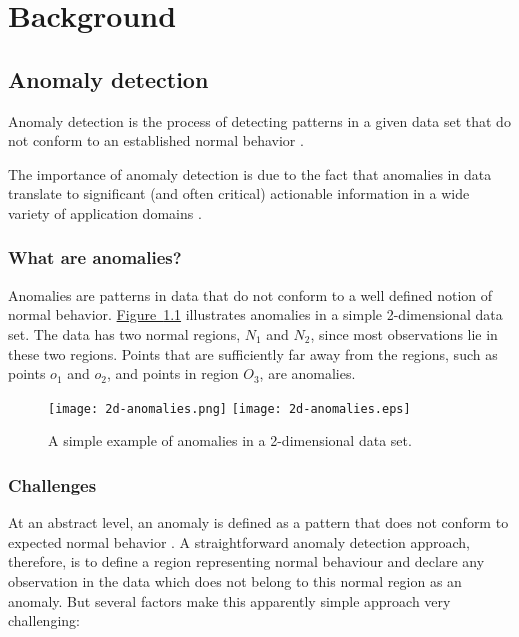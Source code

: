 \chapter{Background}
\label{ch:background}

\section{Anomaly detection}
\label{sec:anomalyDetection}
Anomaly detection is the process of detecting patterns in a given data set that 
do not conform to an established normal behavior \cite{CHANDOLA07}.

The importance of anomaly detection is due to the fact that anomalies in data
translate to significant (and often critical) actionable information in a wide 
variety of application domains \cite{CHANDOLA07}.

\subsection{What are anomalies?}
\label{sec:anomalyDetection:whatAreAnomalies}
Anomalies are patterns in data that do not conform to a well defined notion of
normal behavior. \hyperref[fig:2d-anomlies]{Figure~\ref{fig:2d-anomalies}} 
illustrates anomalies in a simple 2-dimensional data set. The data has two 
normal regions, $N_{1}$ and $N_{2}$, since most observations lie in these two 
regions. Points that are sufficiently far away from the regions, such as points 
$o_{1}$ and $o_{2}$, and points in region $O_{3}$, are anomalies.

\begin{figure}
\centering
\ifpdf
	\texttt{[image: 2d-anomalies.png]}
\else
	\texttt{[image: 2d-anomalies.eps]}
\fi
\caption{A simple example of anomalies in a 2-dimensional data set.}
\label{fig:2d-anomalies}
\end{figure}

\subsection{Challenges}
\label{sec:anomalyDetection:challenges}
At an abstract level, an anomaly is defined as a pattern that does not conform 
to expected normal behavior \cite{CHANDOLA07}. A straightforward anomaly 
detection approach, therefore, is to define a region representing normal 
behaviour and declare any observation in the data which does not belong to this 
normal region as an anomaly. But several factors make this apparently simple 
approach very challenging:

